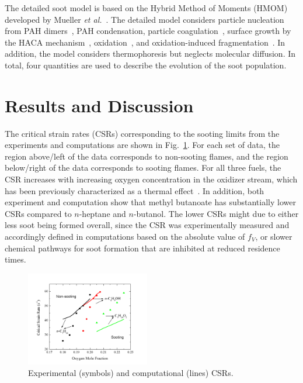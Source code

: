\documentclass[review,3p,times]{elsarticleUS}
\begin{document}
The detailed soot model is based on the Hybrid Method of Moments (HMOM) developed by Mueller \emph{et al.}~\cite{mueller09a,mueller09b,mueller11a}. The detailed model considers particle nucleation from PAH dimers~\cite{schuetz02,wong09,blanquart09c}, PAH condensation, particle coagulation~\cite{mueller09b}, surface growth by the HACA mechanism~\cite{frenklach91}, oxidation~\cite{kazakov95,neoh81}, and oxidation-induced fragmentation~\cite{mueller11a}. In addition, the model considers thermophoresis but neglects molecular diffusion. In total, four quantities are used to describe the evolution of the soot population.

\section{Results and Discussion}

The critical strain rates (CSRs) corresponding to the sooting limits from the experiments and computations are shown in Fig.~\ref{fig:Exp-Comp}. For each set of data, the region above/left of the data corresponds to non-sooting flames, and the region below/right of the data corresponds to sooting flames. For all three fuels, the CSR increases with increasing oxygen concentration in the oxidizer stream, which has been previously characterized as a thermal effect~\cite{du91}. In addition, both experiment and computation show that methyl butanoate has substantially lower CSRs compared to  $n$-heptane and $n$-butanol. The lower CSRs might due to either less soot being formed overall, since the CSR was experimentally measured and accordingly defined in computations based on the absolute value of $f_V$, or slower chemical pathways for soot formation that are inhibited at reduced residence times.

\begin{figure}[ht]
  \centering
  \scriptsize
  \vspace{-0.1in}
  \includegraphics[trim=4mm 8mm 30mm 20mm, clip=true, width=0.48\textwidth]{Exp-Comp.png}
  \normalsize
  \caption{Experimental (symbols) and computational (lines) CSRs.}
  \label{fig:Exp-Comp}
\end{figure}
\end{document}
